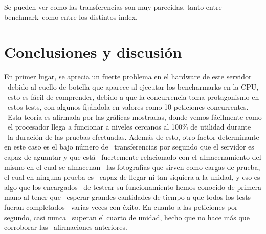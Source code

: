\documentclass[11pt,twoside,a4paper]{book}
\begin{document}
%
%
Se pueden ver como las transferencias son muy parecidas, tanto entre benchmark\
como entre los distintos index.

\chapter{Conclusiones y discusión}

En primer lugar, se aprecia un fuerte problema en el hardware de este servidor \
debido al cuello de botella que aparece al ejecutar los bencharmarks en la CPU, \
esto es fácil de comprender, debido a que la concurrencia toma protagonismo en \
estos tests, con algunos fijándola en valores como 10 peticiones concurrentes. \
Esta teoría es afirmada por las gráficas mostradas, donde vemos fácilmente como \
el procesador llega a funcionar a niveles cercanos al 100\% de utilidad durante \
la duración de las pruebas efectuadas.\newline \newline
\indent Además de esto, otro factor determinante en este caso es el bajo número de \
transferencias por segundo que el servidor es capaz de aguantar y que está \
fuertemente relacionado con el almacenamiento del mismo en el cual se almacenan \
las fotografías que sirven como cargas de prueba, el cual en ninguna prueba es \
capaz de llegar ni tan siquiera a la unidad, y eso es algo que los encargados \
de testear su funcionamiento hemos conocido de primera mano al tener que \
esperar grandes cantidades de tiempo a que todos los tests fueran completados \
varias veces con éxito. En cuanto a las peticiones por segundo, casi nunca \
superan el cuarto de unidad, hecho que no hace más que corroborar las \
afirmaciones anteriores. \newline

\end{document}

